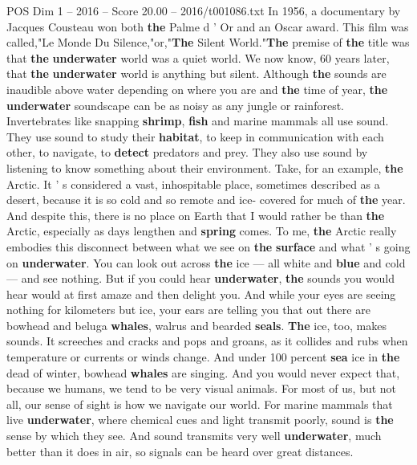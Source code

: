 \begin{textsample}{POS Dim 1 – 2016 – Score 20.00 – 2016/t001086.txt}  \label{ex:f1_pos_053}
In 1956, a documentary by Jacques Cousteau won both \textbf{the} Palme d ' Or and an Oscar award.
This film was called,"Le Monde Du Silence,"or,"\textbf{The} Silent World."\textbf{The} premise of \textbf{the} title was that \textbf{the} \textbf{underwater} world was a quiet world.
We now know, 60 years later, that \textbf{the} \textbf{underwater} world is anything but silent.
Although \textbf{the} sounds are inaudible above water depending on where you are and \textbf{the} time of year, \textbf{the} \textbf{underwater} soundscape can be as noisy as any jungle or rainforest.
Invertebrates like snapping \textbf{shrimp}, \textbf{fish} and marine mammals all use sound.
They use sound to study their \textbf{habitat}, to keep in communication with each other, to navigate, to \textbf{detect} predators and prey.
They also use sound by listening to know something about their environment.
Take, for an example, \textbf{the} Arctic.
It ' s considered a vast, inhospitable place, sometimes described as a desert, because it is so cold and so remote and ice- covered for much of \textbf{the} year.
And despite this, there is no place on Earth that I would rather be than \textbf{the} Arctic, especially as days lengthen and \textbf{spring} comes.
To me, \textbf{the} Arctic really embodies this disconnect between what we see on \textbf{the} \textbf{surface} and what ' s going on \textbf{underwater}.
You can look out across \textbf{the} ice — all white and \textbf{blue} and cold — and see nothing.
But if you could hear \textbf{underwater}, \textbf{the} sounds you would hear would at first amaze and then delight you.
And while your eyes are seeing nothing for kilometers but ice, your ears are telling you that out there are bowhead and beluga \textbf{whales}, walrus and bearded \textbf{seals}. \textbf{The} ice, too, makes sounds.
It screeches and cracks and pops and groans, as it collides and rubs when temperature or currents or winds change.
And under 100 percent \textbf{sea} ice in \textbf{the} dead of winter, bowhead \textbf{whales} are singing.
And you would never expect that, because we humans, we tend to be very visual animals.
For most of us, but not all, our sense of sight is how we navigate our world.
For marine mammals that live \textbf{underwater}, where chemical cues and light transmit poorly, sound is \textbf{the} sense by which they see.
And sound transmits very well \textbf{underwater}, much better than it does in air, so signals can be heard over great distances.

\end{textsample}
